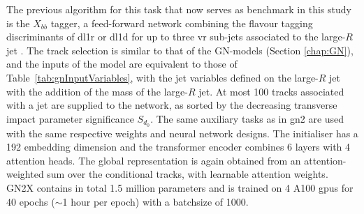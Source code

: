 The previous algorithm for this task that now serves as benchmark in this study is the $X_{bb}$ tagger, a feed-forward network combining the flavour tagging discriminants of \gls{dl1r} or \gls{dl1d} for up to three \gls{vr} sub-jets associated to the large-$R$ jet \cite{ATL-PHYS-PUB-2020-019, ATL-PHYS-PUB-2021-035}. The track selection is similar to that of the GN-models (Section \ref{chap:GN}), and the inputs of the model are equivalent to those of Table~\ref{tab:gnInputVariables}, with the jet variables defined on the large-$R$ jet with the addition of the mass of the large-$R$ jet. At most 100 tracks associated with a jet are supplied to the network, as sorted by the decreasing transverse impact parameter significance $S_{d_0}$. The same auxiliary tasks as in \gls{gn2} are used with the same respective weights and neural network designs. The initialiser has a 192 embedding dimension and the transformer encoder combines 6 layers with 4 attention heads. The global representation is again obtained from an attention-weighted sum over the conditional tracks, with learnable attention weights. GN2X contains in total 1.5 million parameters and is trained on 4 A100 \glspl{gpu} for 40 epochs ($\sim$1 hour per epoch) with a batchsize of 1000. 

